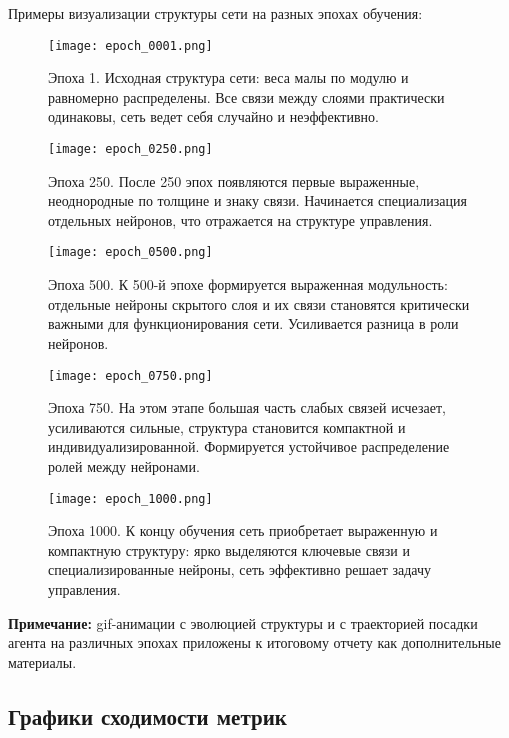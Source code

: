 \documentclass[a4paper,12pt]{article}
\begin{document}
Примеры визуализации структуры сети на разных эпохах обучения:

\begin{figure}[H]
	\centering
	\texttt{[image: epoch\_0001.png]}
	\caption{Эпоха 1. Исходная структура сети: веса малы по модулю и равномерно распределены. Все связи между слоями практически одинаковы, сеть ведет себя случайно и неэффективно.}
\end{figure}

\begin{figure}[H]
	\centering
	\texttt{[image: epoch\_0250.png]}
	\caption{Эпоха 250. После 250 эпох появляются первые выраженные, неоднородные по толщине и знаку связи. Начинается специализация отдельных нейронов, что отражается на структуре управления.}
\end{figure}

\begin{figure}[H]
	\centering
	\texttt{[image: epoch\_0500.png]}
	\caption{Эпоха 500. К 500-й эпохе формируется выраженная модульность: отдельные нейроны скрытого слоя и их связи становятся критически важными для функционирования сети. Усиливается разница в роли нейронов.}
\end{figure}

\begin{figure}[H]
	\centering
	\texttt{[image: epoch\_0750.png]}
	\caption{Эпоха 750. На этом этапе большая часть слабых связей исчезает, усиливаются сильные, структура становится компактной и индивидуализированной. Формируется устойчивое распределение ролей между нейронами.}
\end{figure}

\begin{figure}[H]
	\centering
	\texttt{[image: epoch\_1000.png]}
	\caption{Эпоха 1000. К концу обучения сеть приобретает выраженную и компактную структуру: ярко выделяются ключевые связи и специализированные нейроны, сеть эффективно решает задачу управления.}
\end{figure}

\vspace{1em}
\textbf{Примечание:} gif-анимации с эволюцией структуры и с траекторией посадки агента на различных эпохах приложены к итоговому отчету как дополнительные материалы.

\subsection{Графики сходимости метрик}
\end{document}
